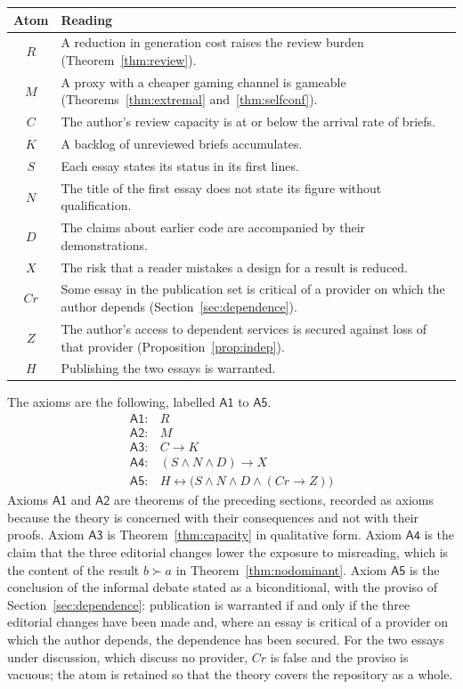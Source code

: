 \documentclass[11pt]{article}
\theoremstyle{plain}
\theoremstyle{definition}
\theoremstyle{remark}
\newcommand{\Hyp}{H}
\begin{document}
\begin{center}
\small
\begin{tabular}{@{}cp{}@{}}
\toprule
Atom & Reading \\
\midrule
$R$ & A reduction in generation cost raises the review burden (Theorem~\ref{thm:review}). \\
$M$ & A proxy with a cheaper gaming channel is gameable (Theorems~\ref{thm:extremal} and~\ref{thm:selfconf}). \\
$C$ & The author's review capacity is at or below the arrival rate of briefs. \\
$K$ & A backlog of unreviewed briefs accumulates. \\
$S$ & Each essay states its status in its first lines. \\
$N$ & The title of the first essay does not state its figure without qualification. \\
$D$ & The claims about earlier code are accompanied by their demonstrations. \\
$X$ & The risk that a reader mistakes a design for a result is reduced. \\
$\mathit{Cr}$ & Some essay in the publication set is critical of a provider on which the author depends (Section~\ref{sec:dependence}). \\
$Z$ & The author's access to dependent services is secured against loss of that provider (Proposition~\ref{prop:indep}). \\
$\Hyp$ & Publishing the two essays is warranted. \\
\bottomrule
\end{tabular}
\end{center}

\noindent The axioms are the following, labelled $\mathsf{A1}$ to $\mathsf{A5}$.
\[
\begin{array}{ll}
\mathsf{A1}: & R\\
\mathsf{A2}: & M\\
\mathsf{A3}: & C\to K\\
\mathsf{A4}: & (S\land N\land D)\to X\\
\mathsf{A5}: & \Hyp\leftrightarrow\bigl(S\land N\land D\land(\mathit{Cr}\to Z)\bigr)
\end{array}
\]
Axioms $\mathsf{A1}$ and $\mathsf{A2}$ are theorems of the preceding sections, recorded as axioms because the theory is concerned with their consequences and not with their proofs. Axiom $\mathsf{A3}$ is Theorem~\ref{thm:capacity} in qualitative form. Axiom $\mathsf{A4}$ is the claim that the three editorial changes lower the exposure to misreading, which is the content of the result $b\succ a$ in Theorem~\ref{thm:nodominant}. Axiom $\mathsf{A5}$ is the conclusion of the informal debate stated as a biconditional, with the proviso of Section~\ref{sec:dependence}: publication is warranted if and only if the three editorial changes have been made and, where an essay is critical of a provider on which the author depends, the dependence has been secured. For the two essays under discussion, which discuss no provider, $\mathit{Cr}$ is false and the proviso is vacuous; the atom is retained so that the theory covers the repository as a whole.
\end{document}
